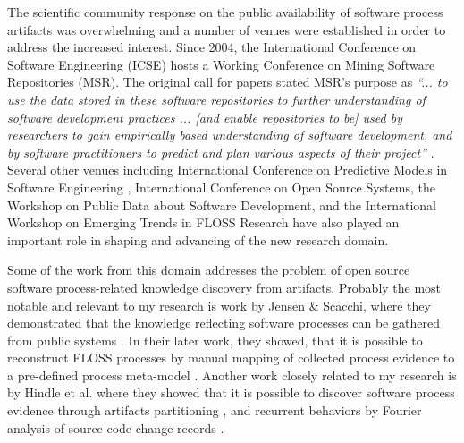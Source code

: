 The scientific community response on the public availability of software process artifacts was overwhelming 
and a number of venues were established in order to address the increased interest. 
Since 2004, the International Conference on Software Engineering (ICSE) hosts a Working Conference on 
Mining Software Repositories (MSR). The original call for papers stated MSR's purpose as 
\textit{``... to use the data stored in these software repositories to further understanding of software 
development practices ... [and enable repositories to be] used by researchers to gain empirically based 
understanding of software development, and by software practitioners to predict and plan various aspects 
of their project''} \cite{msr2004} \cite{citeulike:7853299}. 
Several other venues including  International Conference on Predictive Models in Software Engineering \cite{promise12}, 
International Conference on Open Source Systems, the Workshop on Public Data about Software Development, 
and the International Workshop on Emerging Trends in FLOSS Research have also played
an important role in shaping and advancing of the new research domain.

Some of the work from this domain addresses the problem of open source software process-related 
knowledge discovery from artifacts. 
Probably the most notable and relevant to my research is work by Jensen \& Scacchi, where they demonstrated 
that the knowledge reflecting software processes can be gathered from public systems \cite{citeulike:12550640}. 
In their later work, they showed, that it is possible to reconstruct FLOSS processes by manual mapping of 
collected process evidence to a pre-defined process meta-model \cite{citeulike:5043664} \cite{citeulike:5128808}. 
Another work closely related to my research is by Hindle et al. where they showed that it is possible to 
discover software process evidence through artifacts partitioning \cite{citeulike:10377366},
and recurrent behaviors by Fourier analysis of source code change records \cite{citeulike:10377345}.

